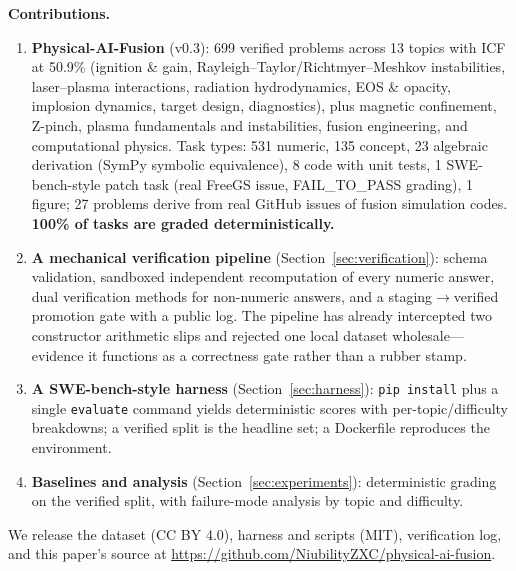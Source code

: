 \textbf{Contributions.}
\begin{enumerate}
    \item \textbf{Physical-AI-Fusion} (v0.3): 699 verified problems across 13 topics with ICF at 50.9\% (ignition \& gain, Rayleigh--Taylor/Richtmyer--Meshkov instabilities, laser--plasma interactions, radiation hydrodynamics, EOS \& opacity, implosion dynamics, target design, diagnostics), plus magnetic confinement, Z-pinch, plasma fundamentals and instabilities, fusion engineering, and computational physics. Task types: 531 numeric, 135 concept, 23 algebraic derivation (SymPy symbolic equivalence), 8 code with unit tests, 1 SWE-bench-style patch task (real FreeGS issue, FAIL\_TO\_PASS grading), 1 figure; 27 problems derive from real GitHub issues of fusion simulation codes. \textbf{100\% of tasks are graded deterministically.}
    \item \textbf{A mechanical verification pipeline} (Section~\ref{sec:verification}): schema validation, sandboxed independent recomputation of every numeric answer, dual verification methods for non-numeric answers, and a staging$\rightarrow$verified promotion gate with a public log. The pipeline has already intercepted two constructor arithmetic slips and rejected one local dataset wholesale---evidence it functions as a correctness gate rather than a rubber stamp.
    \item \textbf{A SWE-bench-style harness} (Section~\ref{sec:harness}): \texttt{pip install} plus a single \texttt{evaluate} command yields deterministic scores with per-topic/difficulty breakdowns; a verified split is the headline set; a Dockerfile reproduces the environment.
    \item \textbf{Baselines and analysis} (Section~\ref{sec:experiments}): deterministic grading on the verified split, with failure-mode analysis by topic and difficulty.
\end{enumerate}

We release the dataset (CC BY 4.0), harness and scripts (MIT), verification log, and this paper's source at \url{https://github.com/NiubilityZXC/physical-ai-fusion}.
